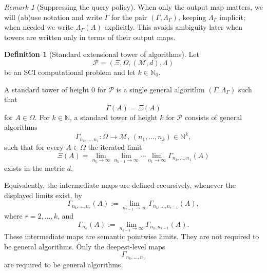 \documentclass{lmcs} %
\theoremstyle{plain}
\theoremstyle{plain}
\theoremstyle{definition}
\newtheorem{definition}[theorem]{Definition}
\theoremstyle{remark}
\newtheorem{remark}[theorem]{Remark}
\theoremstyle{definition}
\theoremstyle{remark}
\numberwithin{equation}{section}
\begin{document}
\begin{remark}[Suppressing the query policy]\label{rem:suppress-query-policy}
When only the output map matters, we will (ab)use notation and write $\Gamma$ for the
pair $(\Gamma,\Lambda_\Gamma)$, keeping $\Lambda_\Gamma$ implicit; when needed we
write $\Lambda_\Gamma(A)$ explicitly.
This avoids ambiguity later when towers are written only in terms of their output maps.
\end{remark}

\begin{definition}[Standard extensional tower of algorithms]\label{def:standard-tower}
Let
\[
        \mathcal P=(\Xi,\Omega,(\mathcal M,d),\Lambda)
\]
be an SCI computational problem and let \(k\in\mathbb N_0\).

A standard tower of height \(0\) for \(\mathcal P\) is a single general algorithm $(\Gamma,\Lambda_\Gamma)$ such that
\[
        \Gamma(A)=\Xi(A)
\]
for $A\in\Omega$. For \(k\in \mathbb{N}\), a standard tower of height \(k\) for \(\mathcal P\) consists of general algorithms
\[
        \Gamma_{n_k,\ldots,n_1}:\Omega\to \mathcal M, \, (n_1,\ldots,n_k)\in\mathbb N^k,
\]
such that for every \(A\in\Omega\) the iterated limit
\[
        \Xi(A) = \lim_{n_k\to\infty} \lim_{n_{k-1}\to\infty} \cdots \lim_{n_1\to\infty} \Gamma_{n_k,\ldots,n_1}(A)
\]
exists in the metric \(d\).

Equivalently, the intermediate maps are defined recursively, whenever the displayed limits exist, by
\[
        \Gamma_{n_k,\ldots,n_r}(A) := \lim_{n_{r-1}\to\infty} \Gamma_{n_k,\ldots,n_{r-1}}(A),
\]
where $r=2,\ldots,k$, and
\[
        \Gamma_{n_k}(A) := \lim_{n_{k-1}\to\infty} \Gamma_{n_k,n_{k-1}}(A).
\]
These intermediate maps are semantic pointwise limits. They are not required to be general algorithms. Only the deepest-level maps
\[
        \Gamma_{n_k,\ldots,n_1}
\]
are required to be general algorithms.
\end{definition}
\end{document}
